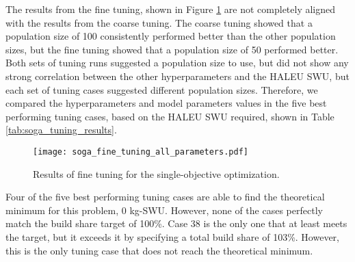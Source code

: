 The results from the fine tuning, shown in Figure \ref{fig:soga_fine_tuning}
are not completely aligned with the results from the coarse tuning. 
The coarse tuning showed that a population size of 100 consistently performed 
better than the other population sizes, but the fine tuning showed that a 
population size of 50 performed better. Both sets of tuning runs suggested 
a population size to use, but did not show any strong correlation between 
the other hyperparameters and the \gls{HALEU} \gls{SWU}, but each set of 
tuning cases suggested different population sizes. Therefore, we compared 
the hyperparameters and model parameters values in the five best performing 
tuning cases, based on the \gls{HALEU} \gls{SWU} required, shown in 
Table \ref{tab:soga_tuning_results}.

\begin{figure}
    \texttt{[image: soga\_fine\_tuning\_all\_parameters.pdf]}
    \caption{Results of fine tuning for the single-objective 
    optimization.}
    \label{fig:soga_fine_tuning}
\end{figure}

Four of the five best performing tuning cases are able to find the 
theoretical minimum for this problem, 0 kg-SWU. However, none of the 
cases perfectly match the build share target of 100\%. Case 38 is the only 
one that at least meets the target, but it exceeds it by specifying a total 
build share of 103\%. However, this is the only tuning case that does 
not reach the theoretical minimum. 

